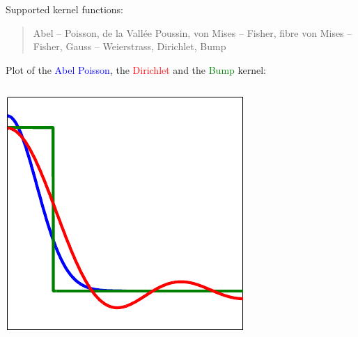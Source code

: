 \begin{frame}[fragile]
Supported kernel functions:
\begin{quote}
  Abel -- Poisson, de la Vall\'ee Poussin, von Mises -- Fisher, fibre von Mises
  -- Fisher, Gauss -- Weierstrass, Dirichlet, Bump
\end{quote}
\vspace*{-0.1cm}
Plot of the \textcolor{blue}{Abel Poisson}, the \textcolor{red}{Dirichlet} and
the \textcolor{green}{Bump} kernel:
\vspace*{-0.1cm}
\begin{center}
	\begin{columns}
		\begin{column}{3.3cm}
		  \includegraphics[width=\columnwidth]{pic/K} \linebreak{ $\Psi$}
		\end{column}
		\begin{column}{3.3cm}

\end{column}
\end{columns}
\end{center}
\end{frame}
